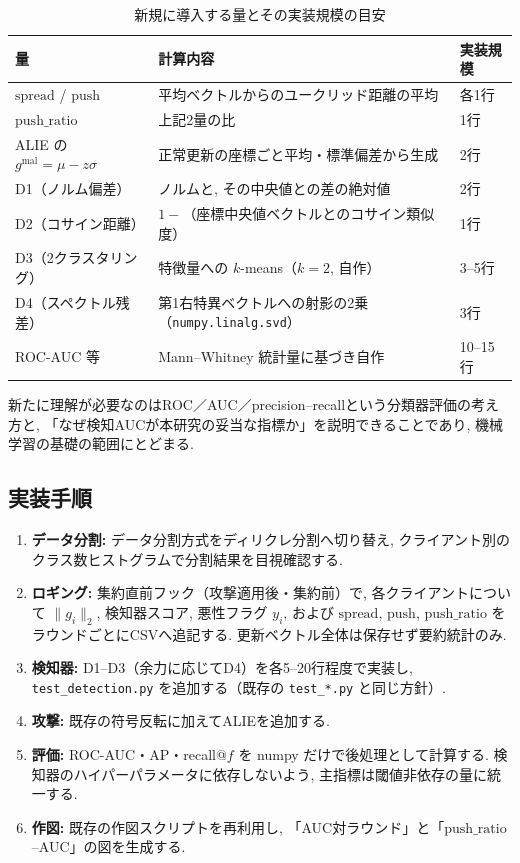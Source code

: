\documentclass[a4j, twocolumn, dvipdfmx]{jsarticle}
\begin{document}
\begin{table}[t]
\centering
\caption{新規に導入する量とその実装規模の目安}
\begin{tabular}{@{}P{4.6cm} P{7.4cm} P{4.2cm}@{}}
\toprule
量 & 計算内容 & 実装規模 \\
\midrule
$\mathrm{spread}$ / $\mathrm{push}$ & 平均ベクトルからのユークリッド距離の平均 & 各1行 \\
$\mathrm{push\_ratio}$ & 上記2量の比 & 1行 \\
ALIE の $g^{\text{mal}} = \mu - z\sigma$ & 正常更新の座標ごと平均・標準偏差から生成 & 2行 \\
D1（ノルム偏差） & ノルムと, その中央値との差の絶対値 & 2行 \\
D2（コサイン距離） & $1-$（座標中央値ベクトルとのコサイン類似度） & 1行 \\
D3（2クラスタリング） & 特徴量への $k$-means（$k=2$, 自作） & 3--5行 \\
D4（スペクトル残差） & 第1右特異ベクトルへの射影の2乗（\texttt{numpy.linalg.svd}） & 3行 \\
ROC-AUC 等 & Mann--Whitney 統計量に基づき自作 & 10--15行 \\
\bottomrule
\end{tabular}
\end{table}

\noindent
新たに理解が必要なのはROC／AUC／precision--recallという分類器評価の考え方と, 「なぜ検知AUCが本研究の妥当な指標か」を説明できることであり, 機械学習の基礎の範囲にとどまる.

\subsection{実装手順}

\begin{enumerate}
  \item \textbf{データ分割:} データ分割方式をディリクレ分割へ切り替え, クライアント別のクラス数ヒストグラムで分割結果を目視確認する.
  \item \textbf{ロギング:} 集約直前フック（攻撃適用後・集約前）で, 各クライアントについて $\|g_i\|_2$, 検知器スコア, 悪性フラグ $y_i$, および $\mathrm{spread}$, $\mathrm{push}$, $\mathrm{push\_ratio}$ をラウンドごとにCSVへ追記する. 更新ベクトル全体は保存せず要約統計のみ.
  \item \textbf{検知器:} D1--D3（余力に応じてD4）を各5--20行程度で実装し, \texttt{test\_detection.py} を追加する（既存の \texttt{test\_*.py} と同じ方針）.
  \item \textbf{攻撃:} 既存の符号反転に加えてALIEを追加する.
  \item \textbf{評価:} ROC-AUC・AP・recall@$f$ を numpy だけで後処理として計算する. 検知器のハイパーパラメータに依存しないよう, 主指標は閾値非依存の量に統一する.
  \item \textbf{作図:} 既存の作図スクリプトを再利用し, 「AUC対ラウンド」と「$\mathrm{push\_ratio}$--AUC」の図を生成する.
\end{enumerate}
\end{document}
